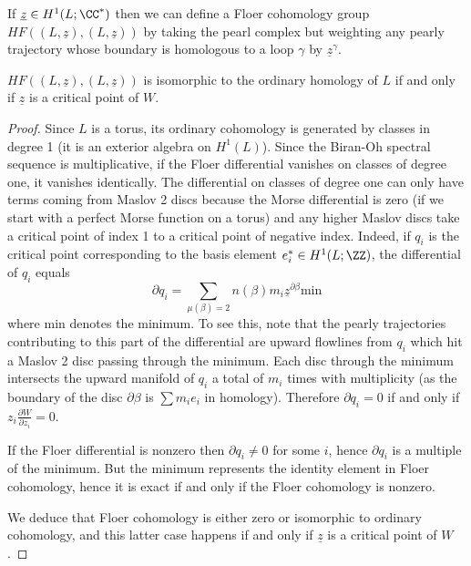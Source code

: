 \documentclass{amsart}
\begin{document}
If $\underline{z}\in H^1(L;\CC^*)$ then we can define a Floer cohomology group $HF((L,\underline{z}),(L,\underline{z}))$ by taking the pearl complex but weighting any pearly trajectory whose boundary is homologous to a loop $\gamma$ by $\underline{z}^{\gamma}$.

\begin{Theorem}
  $HF((L,\underline{z}),(L,\underline{z}))$ is isomorphic to the ordinary homology of $L$ if and only if $\underline{z}$ is a critical point of $W$.
\end{Theorem}
\begin{proof}
  Since $L$ is a torus, its ordinary cohomology is generated by classes in degree 1 (it is an exterior algebra on $H^1(L)$). Since the Biran-Oh spectral sequence is multiplicative, if the Floer differential vanishes on classes of degree one, it vanishes identically. The differential on classes of degree one can only have terms coming from Maslov 2 discs because the Morse differential is zero (if we start with a perfect Morse function on a torus) and any higher Maslov discs take a critical point of index 1 to a critical point of negative index. Indeed, if $q_i$ is the critical point corresponding to the basis element $e^*_i\in H^1(L;\ZZ)$, the differential of $q_i$ equals
  \[\partial q_i=\sum_{\mu(\beta)=2}n(\beta)m_i\underline{z}^{\partial\beta}\mathrm{min}\]
  where $\mathrm{min}$ denotes the minimum. To see this, note that the pearly trajectories contributing to this part of the differential are upward flowlines from $q_i$ which hit a Maslov 2 disc passing through the minimum. Each disc through the minimum intersects the upward manifold of $q_i$ a total of $m_i$ times with multiplicity (as the boundary of the disc $\partial\beta$ is $\sum m_ie_i$ in homology). Therefore $\partial q_i=0$ if and only if $z_i\frac{\partial W}{\partial z_i}=0$.

  If the Floer differential is nonzero then $\partial q_i\neq 0$ for some $i$, hence $\partial q_i$ is a multiple of the minimum. But the minimum represents the identity element in Floer cohomology, hence it is exact if and only if the Floer cohomology is nonzero.
  
  We deduce that Floer cohomology is either zero or isomorphic to ordinary cohomology, and this latter case happens if and only if $\underline{z}$ is a critical point of $W$.
\end{proof}
\end{document}
